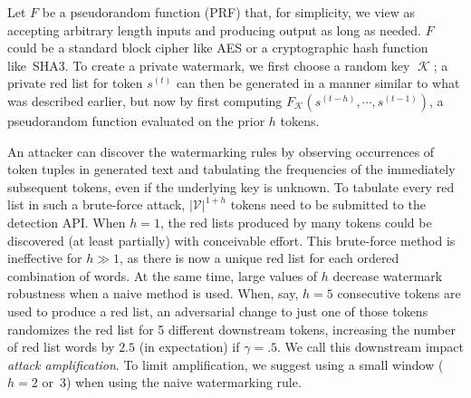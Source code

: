 \documentclass{article}
\theoremstyle{plain}
\theoremstyle{definition}
\theoremstyle{remark}
\DeclareMathOperator*{\key}{{\mathcal{K}}}
\newcommand{\vocab}{\mathcal{V}}
\begin{document}
\sloppy
Let $F$ be a pseudorandom function (PRF) that, for simplicity, we view as accepting arbitrary length inputs and producing output as long as needed. $F$ could be a standard block cipher like AES or a cryptographic hash function like~SHA3. To create a private watermark, we first choose a random key $\key$; 
a private red list for token $s^{(t)}$ can then be generated in a manner similar to what was described earlier, but now by first computing $F_{\key}(s^{(t-h)},\cdots, s^{(t-1)})$, a pseudorandom function evaluated on the prior $h$ tokens. 

An attacker can discover the watermarking rules by observing occurrences of token tuples in generated text and tabulating the frequencies of the immediately subsequent tokens, even if the underlying key is unknown. To tabulate every red list in such a brute-force attack, $|\vocab|^{1 + h}$ tokens need to be submitted to the detection API.
When $h=1$, the red lists produced by many tokens could be discovered (at least partially) with conceivable effort. 
This brute-force method is ineffective for $h \gg 1$, as there is now a unique red list for each ordered combination of words.  
At the same time, large values of $h$ decrease watermark robustness when a naive method is used.  When, say, $h=5$ consecutive tokens are used to produce a red list, an adversarial change to just one of those tokens randomizes the red list for 5 different downstream tokens, increasing the number of red list words by $2.5$ (in expectation) if $\gamma=.5$. We call this downstream impact {\em attack amplification}. To limit amplification, we suggest using a small window ($h=2$ or~$3$) when using the naive watermarking rule. 
\end{document}
